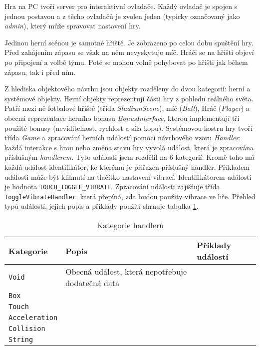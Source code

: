 \documentclass[thesis=B,czech,hidelinks]{FITthesis}[2012/06/26] %
\newcommand{\code}[1]{\texttt{#1}}
\begin{document}
Hra na PC tvoří server pro interaktivní ovladače. Každý ovladač je spojen s jednou postavou a z těcho ovladačů je zvolen jeden (typicky označovaný jako \textit{admin}), který může spravovat nastavení hry.

Jedinou herní scénou je samotné hřiště. Je zobrazeno po celou dobu spuštění hry. Před zahájením zápasu se však na něm nevyskytuje míč. Hráči se na hřišti objeví po připojení a volbě týmu. Poté se mohou volně pohybovat po hřišti jak během zápasu, tak i před ním. 

Z hlediska objektového návrhu jsou objekty rozděleny do dvou kategorií: herní a systémové objekty. Herní objekty reprezentují části hry z pohledu reálného světa. Patří mezi ně fotbalové hřiště (třída \textit{StadiumScene}), míč (\textit{Ball}), Hráč (\textit{Player}) a obecná reprezentace herního bonusu \textit{BonusInterface}, kterou implementují tři použité bonusy (neviditelnost, rychlost a síla kopu). Systémovou kostru hry tvoří třída \textit{Game} a zpracování herních událostí pomocí návrhového vzoru \textit{Handler}\cite{patterns}: každá interakce s hrou nebo změna stavu hry vyvolá událost, která je zpracována příslušným \textit{handlerem}. Tyto události jsem rozdělil na 6 kategorií. Kromě toho má každá událost identifikátor, ke kterému je přiřazen příslušný handler. Příkladem události může být kliknutí na tlačítko nastavení vibrací. Identifikátorem události je hodnota \code{TOUCH\_TOGGLE\_VIBRATE}. Zpracování události zajišťuje třída \code{ToggleVibrateHandler}, která přepíná, zda budou použity vibrace ve hře. Přehled typů událostí, jejich popis a příklady použití shrnuje tabulka \ref{table:handlers}.

\begin{table}[h]
\caption{Kategorie handlerů}
\label{table:handlers}
\begin{tabularx}{\textwidth}{|X|X|X|}
\hline
\textbf{Kategorie} & \textbf{Popis} & \textbf{Příklady událostí} \\ \hline
\code{Void} & Obecná událost, která nepotřebuje dodatečná data \\ \hline
\code{Box} & \\ \hline
\code{Touch} & \\ \hline
\code{Acceleration} & \\ \hline
\code{Collision} & \\ \hline
\code{String} & \\ \hline

\end{tabularx}
\end{table}
\end{document}
